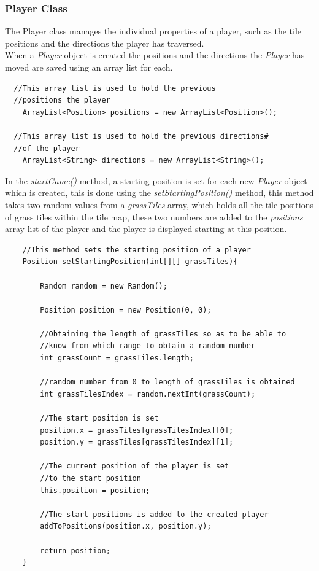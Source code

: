 \documentclass[a4paper,12pt]{extarticle}
\begin{document}
\vspace{4mm}

\newpage
\subsubsection{Player Class}
\noindent The Player class manages the individual properties of a player, such as the tile positions and the directions the player has traversed.\\

\noindent When a \textit{Player} object is created the positions and the directions the \textit{Player} has moved are saved using an array list for each.

\begin{lstlisting}
  //This array list is used to hold the previous 
  //positions the player
    ArrayList<Position> positions = new ArrayList<Position>();

  //This array list is used to hold the previous directions#
  //of the player
    ArrayList<String> directions = new ArrayList<String>();
\end{lstlisting}
\vspace{4mm}

\noindent In the \textit{startGame()} method, a starting position is set for each new \textit{Player} object which is created, this is done using the \textit{setStartingPosition()} method, this method takes two random values from a \textit{grassTiles} array, which holds all the tile positions of grass tiles within the tile map, these two numbers are added to the \textit{positions} array list of the player and the player is displayed starting at this position.

\begin{lstlisting}
    //This method sets the starting position of a player
    Position setStartingPosition(int[][] grassTiles){

        Random random = new Random();

        Position position = new Position(0, 0);

        //Obtaining the length of grassTiles so as to be able to 
        //know from which range to obtain a random number
        int grassCount = grassTiles.length;

        //random number from 0 to length of grassTiles is obtained
        int grassTilesIndex = random.nextInt(grassCount);

        //The start position is set
        position.x = grassTiles[grassTilesIndex][0];
        position.y = grassTiles[grassTilesIndex][1];

        //The current position of the player is set 
        //to the start position
        this.position = position;

        //The start positions is added to the created player
        addToPositions(position.x, position.y);

        return position;
    }
\end{lstlisting}
\vspace{4mm}
\end{document}
